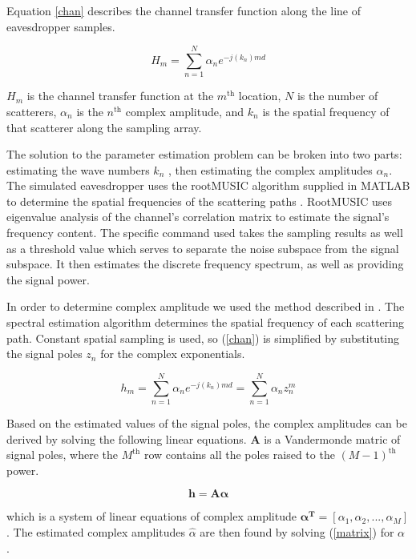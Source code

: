 \documentclass{allertonproc}
\begin{document}
Equation \ref{chan} describes the channel transfer function along the line of eavesdropper samples.

\begin{equation}\label{chan}
H_m= \sum_{n=1}^N \alpha_n e^{-j(k_n)md}
\end{equation}

 $H_m$ is the channel transfer function at the $m^{\mathrm{th}}$ location, $N$ is the number of scatterers, $\alpha_n$ is the $n^{\mathrm{th}}$ complex amplitude, and $k_n$ is the spatial frequency of that scatterer along the sampling array.  

The solution to the parameter estimation problem can be broken into two parts: estimating the wave numbers $k_n$ , then estimating the complex amplitudes $\alpha_n$. The simulated eavesdropper uses the rootMUSIC algorithm supplied in MATLAB to determine the spatial frequencies of the scattering paths \cite{matlab}. RootMUSIC uses eigenvalue analysis of the channel's correlation matrix to estimate the signal's frequency content. The specific command used takes the sampling results as well as a threshold value which serves to separate the noise subspace from the signal subspace. It then estimates the discrete frequency spectrum, as well as providing the signal power. 

In order to determine complex amplitude we used the method described in \cite{andersen1999}. The spectral estimation algorithm determines the spatial frequency of each scattering path. Constant spatial sampling is used, so (\ref{chan}) is simplified by substituting the signal poles $z_n$ for the complex exponentials.

\begin{equation}\label{complexamp}
h_m = \sum_{n=1}^N \alpha_n e^{-j(k_n)md} = \sum_{n=1}^N \alpha_n z_n^m
\end{equation}

Based on the estimated values of the signal poles, the complex amplitudes can be derived by solving the following linear equations. $\boldsymbol{A}$ is a Vandermonde matric of signal poles, where the $M^\mathrm{th}$ row contains all the poles raised to the $(M-1)^\mathrm{th}$ power. 

\begin{equation}\label{matrix}
\mathbf{h} = \mathbf{A \boldsymbol{\alpha}}
\end{equation}

which is a system of linear equations of complex amplitude $\boldsymbol{\alpha^T} = [\alpha_1, \alpha_2,... ,\alpha_M]$. The estimated complex amplitudes $\hat{\alpha}$ are then found by solving (\ref{matrix}) for $\alpha$ \cite{andersen1999}.
\end{document}
